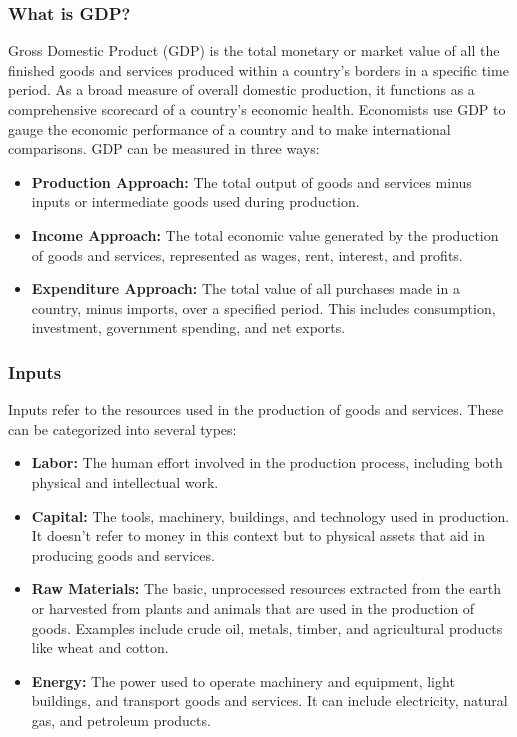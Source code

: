 \documentclass{report}
\begin{document}
     \subsubsection{What is GDP?}
     \bigbreak \noindent 
     Gross Domestic Product (GDP) is the total monetary or market value of all the finished goods and services produced within a country's borders in a specific time period. As a broad measure of overall domestic production, it functions as a comprehensive scorecard of a country’s economic health. Economists use GDP to gauge the economic performance of a country and to make international comparisons. GDP can be measured in three ways:
     \bigbreak \noindent 
     \begin{itemize}
         \item \textbf{Production Approach:} The total output of goods and services minus inputs or intermediate goods used during production.
         \item \textbf{Income Approach:} The total economic value generated by the production of goods and services, represented as wages, rent, interest, and profits.
         \item \textbf{Expenditure Approach:} The total value of all purchases made in a country, minus imports, over a specified period. This includes consumption, investment, government spending, and net exports.
     \end{itemize}
     \bigbreak \noindent 
     \subsubsection{Inputs}
     \bigbreak \noindent 
     Inputs refer to the resources used in the production of goods and services. These can be categorized into several types:
     \bigbreak \noindent 
     \begin{itemize}
         \item \textbf{Labor:} The human effort involved in the production process, including both physical and intellectual work.
         \item \textbf{Capital:} The tools, machinery, buildings, and technology used in production. It doesn't refer to money in this context but to physical assets that aid in producing goods and services.
         \item \textbf{Raw Materials:} The basic, unprocessed resources extracted from the earth or harvested from plants and animals that are used in the production of goods. Examples include crude oil, metals, timber, and agricultural products like wheat and cotton.
         \item \textbf{Energy:} The power used to operate machinery and equipment, light buildings, and transport goods and services. It can include electricity, natural gas, and petroleum products.
     \end{itemize}
     \bigbreak \noindent 
\end{document}
